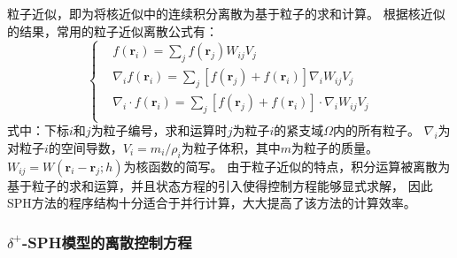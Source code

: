 粒子近似，即为将核近似中的连续积分离散为基于粒子的求和计算。%
根据核近似的结果，常用的粒子近似离散公式有：
\begin{equation}
  \left\{
    \begin{aligned}
      & f\left(\bm{r}_i\right) = \sum_j f\left(\bm{r}_j\right) W_{ij} V_j \\
      & \nabla_i f\left(\bm{r}_i\right) = \sum_j %
      \left[f\left(\bm{r}_j\right) + f\left(\bm{r}_i\right)\right] \nabla_i W_{ij} V_j \\
      & \nabla_i \cdot f\left(\bm{r}_i\right) = \sum_j %
      \left[f\left(\bm{r}_j\right) + f\left(\bm{r}_i\right)\right] \cdot \nabla_i W_{ij} V_j \\
    \end{aligned}
  \right.
\end{equation}
式中：下标$i$和$j$为粒子编号，求和运算时$j$为粒子$i$的紧支域$\Omega$内的所有粒子。%
$\nabla_i$为对粒子$i$的空间导数，$V_i = m_i/\rho_i$为粒子体积，其中$m$为粒子的质量。%
$W_{ij} = W\left(\bm{r}_i - \bm{r}_j; h\right)$为核函数的简写。%
由于粒子近似的特点，积分运算被离散为基于粒子的求和运算，并且状态方程的引入使得控制方程能够显式求解，%
因此SPH方法的程序结构十分适合于并行计算，大大提高了该方法的计算效率。

\subsubsection{
  \texorpdfstring{$\delta^+$-SPH模型的离散控制方程} %
  {\thesubsubsection delta-plus-SPH模型的离散控制方程} %
}
\label{sssec:Delta-plus-SPH模型的离散控制方程}

